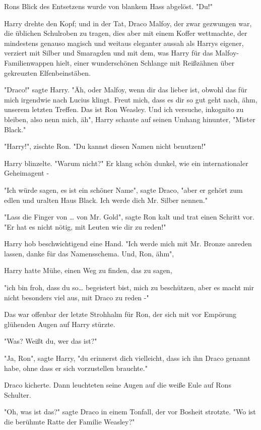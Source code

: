 {Rons Blick des Entsetzens wurde von blankem Hass abgelöst. "Du!"

Harry drehte den Kopf; und in der Tat, Draco Malfoy, der zwar gezwungen war, die üblichen Schulroben zu tragen, dies aber mit einem Koffer wettmachte, der mindestens genauso magisch und weitaus eleganter aussah als Harrys eigener, verziert mit Silber und Smaragden und mit dem, was Harry für das Malfoy-Familienwappen hielt, einer wunderschönen Schlange mit Reißzähnen über gekreuzten Elfenbeinstäben.

"Draco!" sagte Harry. "Äh, oder Malfoy, wenn dir das lieber ist, obwohl das für mich irgendwie nach Lucius klingt. Freut mich, dass es dir so gut geht nach, ähm, unserem letzten Treffen. Das ist Ron Weasley. Und ich versuche, inkognito zu bleiben, also nenn mich, äh", Harry schaute auf seinen Umhang hinunter, "Mister Black."

"Harry!", zischte Ron. "Du kannst diesen Namen nicht benutzen!"

Harry blinzelte. "Warum nicht?" Er klang schön dunkel, wie ein internationaler Geheimagent -

"Ich würde sagen, es ist ein schöner Name", sagte Draco, "aber er gehört zum edlen und uralten Haus Black. Ich werde dich Mr. Silber nennen."

"Lass die Finger von … von Mr. Gold", sagte Ron kalt und trat einen Schritt vor. "Er hat es nicht nötig, mit Leuten wie dir zu reden!"

Harry hob beschwichtigend eine Hand. "Ich werde mich mit Mr. Bronze anreden lassen, danke für das Namensschema. Und, Ron, ähm",

Harry hatte Mühe, einen Weg zu finden, das zu sagen,

"ich bin froh, dass du so… begeistert bist, mich zu beschützen, aber es macht mir nicht besonders viel aus, mit Draco zu reden -"

Das war offenbar der letzte Strohhalm für Ron, der sich mit vor Empörung glühenden Augen auf Harry stürzte.

"Was? Weißt du, wer das ist?"

"Ja, Ron", sagte Harry, "du erinnerst dich vielleicht, dass ich ihn Draco genannt habe, ohne dass er sich vorzustellen brauchte."

Draco kicherte. Dann leuchteten seine Augen auf die weiße Eule auf Rons Schulter.

"Oh, was ist das?" sagte Draco in einem Tonfall, der vor Bosheit strotzte. "Wo ist die berühmte Ratte der Familie Weasley?"

}
